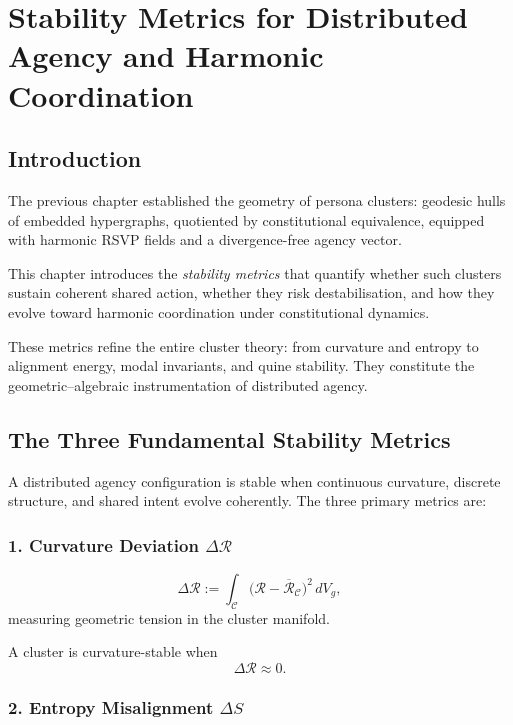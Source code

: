 \chapter{Stability Metrics for Distributed Agency and Harmonic Coordination}
\label{ch:stability-metrics-distributed-agency}

\section{Introduction}

The previous chapter established the geometry of persona clusters:
geodesic hulls of embedded hypergraphs, quotiented by constitutional
equivalence, equipped with harmonic RSVP fields and a divergence-free agency vector.

This chapter introduces the \emph{stability metrics} that quantify whether such clusters
sustain coherent shared action, whether they risk destabilisation,
and how they evolve toward harmonic coordination under constitutional dynamics.

These metrics refine the entire cluster theory:
from curvature and entropy to alignment energy, modal invariants, and quine stability.
They constitute the geometric–algebraic instrumentation of distributed agency.


\section{The Three Fundamental Stability Metrics}

A distributed agency configuration is stable when
continuous curvature, discrete structure, and shared intent evolve coherently.
The three primary metrics are:

\subsection{1. Curvature Deviation \texorpdfstring{$\Delta\mathcal{R}$}{ΔR}}

\[
\Delta\mathcal{R}
:= 
\int_{\mathcal{C}}
\bigl(\mathcal{R} - \overline{\mathcal{R}}_{\mathcal{C}}\bigr)^2 \, dV_g,
\]
measuring geometric tension in the cluster manifold.

A cluster is curvature-stable when
\[
\Delta\mathcal{R} \approx 0.
\]

\subsection{2. Entropy Misalignment \texorpdfstring{$\Delta S$}{ΔS}}

